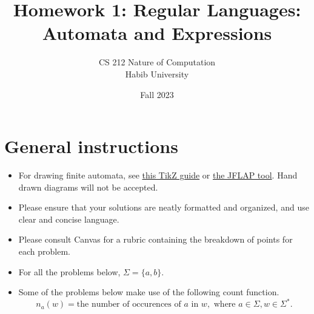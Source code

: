 \documentclass[addpoints]{exam}
\title{Homework 1: Regular Languages: Automata and Expressions}
\author{CS 212 Nature of Computation\\Habib University}
\date{Fall 2023}
\theoremstyle{claim}
\begin{document}
\maketitle

\section*{General instructions}
\begin{itemize}
\item For drawing finite automata, see  \href{https://www3.nd.edu/~kogge/courses/cse30151-fa17/Public/other/tikz_tutorial.pdf}{this TikZ guide} or \href{https://www.jflap.org}{the JFLAP tool}. Hand drawn diagrams will not be accepted.
\item Please ensure that your solutions are neatly formatted and organized, and use clear and
concise language.
\item Please consult Canvas for a rubric containing the breakdown of points for each problem.
\item For all the problems below, $\Sigma=\{a,b\}$.
\item Some of the problems below make use of the following count function.
\[
    n_a(w) =  \text{the number of occurences of } a\text{ in } w, \text{ where } a\in\Sigma,w\in\Sigma^*.
\]
\end{itemize}
\end{document}
